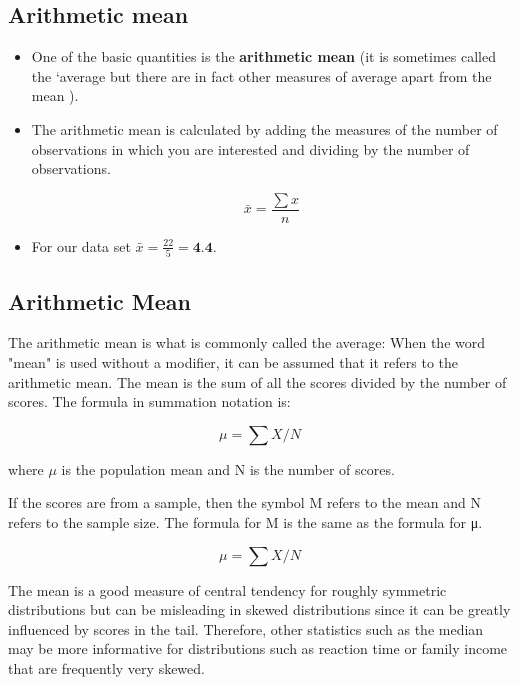 \documentclass[]{report}
\begin{document}
\subsection{Arithmetic mean} 
\begin{itemize}
\item One of the basic quantities is the \textbf{arithmetic mean} (it is sometimes
called the `average but there are in fact other measures of average apart from the
mean ). 
\item The arithmetic mean is calculated by
adding the measures of the number of observations in which you are interested and
dividing by the number of observations.

\[ \bar{x} =  \frac{\sum x}{n}  \]

\item For our data set $\bar{x} = \frac{22}{5}  = \textbf{4.4}$.
\end{itemize}

\subsection{Arithmetic Mean}
The arithmetic mean is what is commonly called the average: When the word "mean" is used without a modifier, it can be assumed that it refers to the arithmetic mean. The mean is the sum of all the scores divided by the number of scores. The formula in summation notation is:

\[\mu = \sum X/N\]

where $\mu$ is the population mean and N is the number of scores. 

If the scores are from a sample, then the symbol M refers to the mean and N refers to the sample size. The formula for M is the same as the formula for
μ. 

\[\mu = \sum X/N\]

The mean is a good measure of central tendency for roughly symmetric distributions but can be misleading in skewed distributions since it can be greatly influenced by scores in the tail. Therefore, other statistics such as the median may be more informative for distributions such as reaction time or family income that are frequently very skewed.
\end{document}
